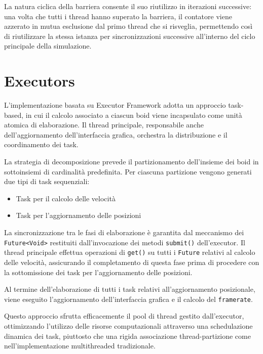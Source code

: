 \documentclass[a4paper,12pt]{report}
\begin{document}
        La natura ciclica della barriera consente il suo riutilizzo in iterazioni successive: una volta che tutti i thread hanno superato la barriera, il contatore viene azzerato in mutua esclusione dal primo thread che si risveglia, permettendo così di riutilizzare la stessa istanza per sincronizzazioni successive all'interno del ciclo principale della simulazione.
        
    \section{Executors}
        
        L'implementazione basata su Executor Framework adotta un approccio task-based, in cui il calcolo associato a ciascun boid viene incapsulato come unità atomica di elaborazione. Il thread principale, responsabile anche dell'aggiornamento dell'interfaccia grafica, orchestra la distribuzione e il coordinamento dei task.
        
        La strategia di decomposizione prevede il partizionamento dell'insieme dei boid in sottoinsiemi di cardinalità predefinita. Per ciascuna partizione vengono generati due tipi di task sequenziali:
        \begin{itemize}
            \item Task per il calcolo delle velocità
            \item Task per l'aggiornamento delle posizioni
        \end{itemize}
        
        La sincronizzazione tra le fasi di elaborazione è garantita dal meccanismo dei \texttt{Future<Void>} restituiti dall'invocazione dei metodi \texttt{submit()} dell'executor. Il thread principale effettua operazioni di \texttt{get()} su tutti i \texttt{Future} relativi al calcolo delle velocità, assicurando il completamento di questa fase prima di procedere con la sottomissione dei task per l'aggiornamento delle posizioni.
        
        Al termine dell'elaborazione di tutti i task relativi all'aggiornamento posizionale, viene eseguito l'aggiornamento dell'interfaccia grafica e il calcolo del \texttt{framerate}.
        
        Questo approccio sfrutta efficacemente il pool di thread gestito dall'executor, ottimizzando l'utilizzo delle risorse computazionali attraverso una schedulazione dinamica dei task, piuttosto che una rigida associazione thread-partizione come nell'implementazione multithreaded tradizionale.
        
\end{document}
